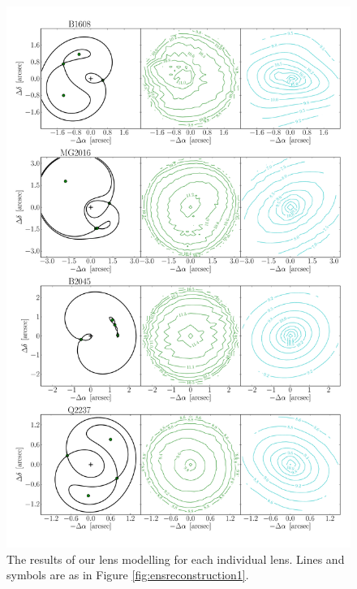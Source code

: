 \documentclass[useAMS,usenatbib]{mn2e}
\begin{document}
\begin{figure}
  \centering
  \includegraphics[width=.8\linewidth]{Figures/AllLenses33.pdf}
  \caption[width=.65\linewidth]{The results of our lens modelling for each individual lens. Lines and symbols are as in Figure \ref{fig:ensreconstruction1}.}
  \label{fig:lensreconstruction3}
\end{figure}
\end{document}
